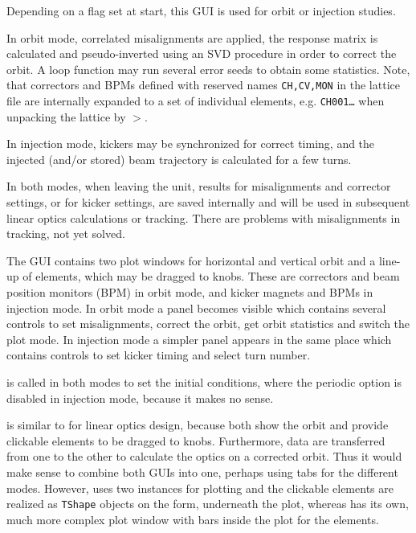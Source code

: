 \documentclass[12pt]{article}
\newcommand\code[1]{{\tt #1}}
\newcommand{\unico}[1]{{\color{burntorange}\code{#1}}}
\newcommand{\prcod}[2]{\opauni{#1}$>$\unico{#2}}
\newcommand{\opagui}[1]{\colorbox{blue!20}{{\color{black}\code{#1}}}}
\newcommand{\ogui}[1]{\hyperref[#1]{\opagui{#1}}}
\newcommand{\opaguif}[1]{\colorbox{violet!30}{{\color{black}\code{#1}}}}
\newcommand{\oguif}[1]{\hyperref[#1]{\opaguif{#1}}}
\newcommand{\opauni}[1]{\colorbox{orange!30}{{\color{black}\code{#1}}}}
\newcommand{\desc}[1]{#1}
\newcommand{\todo}[1]{{\color{red} #1}}
\begin{document}
\desc{Depending on a flag set at start, this GUI is used for orbit or injection studies. 

In orbit mode, correlated misalignments are applied, the response matrix is calculated and pseudo-inverted using an SVD procedure in order to correct the orbit. A loop function may run several error seeds to obtain some statistics. Note, that correctors and BPMs defined with reserved names \code{CH,CV,MON} in the lattice file are internally expanded to a set of individual elements, e.g. \code{CH001\dots} when unpacking the lattice by \prcod{editorlib}{MakeLattice}.

In injection mode, kickers may be synchronized for correct timing, and the injected (and/or stored) beam trajectory is calculated for a few turns.

In both modes, when leaving the unit, results for misalignments and corrector settings, or for kicker settings, are saved internally and will be used in subsequent linear optics calculations or tracking. \todo{There are problems with misalignments in tracking, not yet solved.}

The GUI contains two plot windows for horizontal and vertical orbit and a line-up of elements, which may be dragged to knobs. These are correctors and beam position monitors (BPM) in orbit mode, and kicker magnets and BPMs in injection mode. In orbit mode a panel becomes visible which contains several controls to set misalignments, correct the orbit, get orbit statistics and switch the plot mode. In injection mode a simpler panel appears in the same place which contains controls to set kicker timing and select turn number.

\ogui{ostartmenu} is called in both modes to set the initial conditions, where the periodic option is disabled in injection mode, because it makes no sense.

\todo{\ogui{opaorbit} is similar to \ogui{opalinop} for linear optics design, because both show the orbit and provide clickable elements to be dragged to knobs. Furthermore, data are transferred from one to the other to calculate the optics on a corrected orbit. Thus it would make sense to combine both GUIs into one, perhaps using tabs for the different modes. However, \ogui{opaorbit} uses two \oguif{comfigureframe} instances for plotting and the clickable elements are realized as \code{TShape} objects on the form, underneath the plot, whereas \ogui{opalinop} has its own, much more complex plot window with bars inside the plot for the elements.}
}
\end{document}
